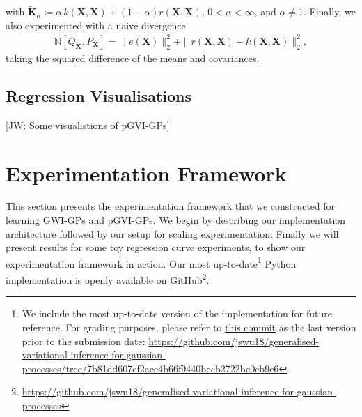 \documentclass{article}
\newcommand{\jw}[1]{{\color{gray} [JW: #1]}}
\numberwithin{equation}{section}
\begin{document}
with $\tilde{\textbf{K}}_{\alpha} \coloneqq \alpha \, k(\mathbf{X}, \mathbf{X}) + (1-\alpha)  r(\mathbf{X}, \mathbf{X})$, $0 < \alpha < \infty$, and $\alpha \neq 1$.
Finally, we also experimented with a naive divergence
\begin{align}
    \mathbb{N} \left[Q_{\mathbf{X}}, P_{\mathbf{X}}\right] = \| e(\mathbf{X})\|_2^2 + \|r(\mathbf{X}, \mathbf{X})-k(\mathbf{X}, \mathbf{X})\|_2^2,
\end{align}
taking the squared difference of the means and covariances.

\subsection{Regression Visualisations}
\jw{Some visualistions of pGVI-GPs}

\newpage
\section{Experimentation Framework}
This section presents the experimentation framework that we constructed for learning GWI-GPs and pGVI-GPs.
We begin by describing our implementation architecture followed by our setup for scaling experimentation.
Finally we will present results for some toy regression curve experiments, to show our experimentation framework in action.
Our most up-to-date\footnote{We include the most up-to-date version of the implementation for future reference. For grading purposes, please refer to \href{https://github.com/jswu18/generalised-variational-inference-for-gaussian-processes/tree/7b81dd607ef2ace4b66f9440becb2722be0eb9e6}{this commit} as the last version prior to the submission date: \href{https://github.com/jswu18/generalised-variational-inference-for-gaussian-processes/tree/7b81dd607ef2ace4b66f9440becb2722be0eb9e6}{https://github.com/jswu18/generalised-variational-inference-for-gaussian-processes/tree/7b81dd607ef2ace4b66f9440becb2722be0eb9e6}} Python implementation is openly available on \href{https://github.com/jswu18/generalised-variational-inference-for-gaussian-processes}{GitHub}\footnote{\href{https://github.com/jswu18/generalised-variational-inference-for-gaussian-processes}{https://github.com/jswu18/generalised-variational-inference-for-gaussian-processes}}.
\end{document}
